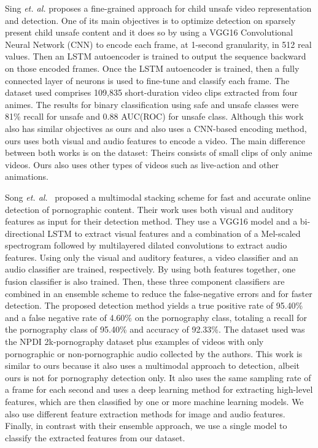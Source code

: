 Sing \textit{et. al.}\cite{singh2019kidsguard} proposes a fine-grained approach for child unsafe video representation and detection. One of its main objectives is to optimize detection on sparsely present child unsafe content and it does so by using a VGG16\cite{vgg} Convolutional Neural Network (CNN) to encode each frame, at 1-second granularity, in 512 real values. 
Then an LSTM autoencoder is trained to output the sequence backward on those encoded frames. 
Once the LSTM autoencoder is trained, then a fully connected layer of neurons is used to fine-tune and classify each frame. 
The dataset used comprises 109,835 short-duration video clips extracted from four animes. 
The results for binary classification using safe and unsafe classes were 81\% recall for unsafe and 0.88 AUC(ROC) for unsafe class.
Although this work also has similar objectives as ours and also uses a CNN-based encoding method, ours uses both visual and audio features to encode a video. 
The main difference between both works is on the dataset: Theirs consists of small clips of only anime videos. Ours also uses other types of videos such as live-action and other animations. 

Song \textit{et. al.}~\cite{song2020enhanced} proposed a multimodal stacking scheme for fast and accurate online detection of pornographic content.
Their work uses both visual and auditory features as input for their detection method. 
They use a VGG16 model and a bi-directional LSTM to extract visual features and a combination of a Mel-scaled spectrogram followed by multilayered dilated convolutions to extract audio features. 
Using only the visual and auditory features, a video classifier and an audio classifier are trained, respectively. 
By using both features together, one fusion classifier is also trained.
Then, these three component classifiers are combined in an ensemble scheme to reduce the false-negative errors and for faster detection. 
The proposed detection method yields a true positive rate of 95.40\% and a false negative rate of 4.60\% on the pornography class, totaling a recall for the pornography class of 95.40\% and accuracy of 92.33\%. 
The dataset used was the NPDI 2k-pornography\cite{2kdataset} dataset plus examples of videos with only pornographic or non-pornographic audio collected by the authors. 
This work is similar to ours because it also uses a multimodal approach to detection, albeit ours is not for pornography detection only.
It also uses the same sampling rate of a frame for each second and uses a deep learning method for extracting high-level features, which are then classified by one or more machine learning models. 
We also use different feature extraction methods for image and audio features. 
Finally, in contrast with their ensemble approach, we use a single model to classify the extracted features from our dataset.


